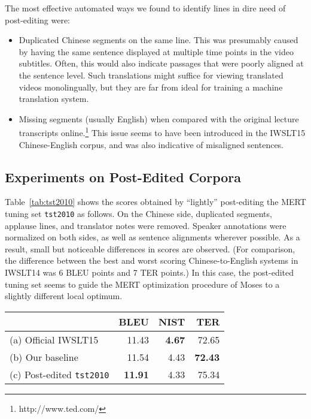 {The most effective automated ways we found to identify lines in dire need of post-editing were:
\begin{itemize}
\item 
Duplicated Chinese segments on the same line. 
This was presumably caused by having the same sentence displayed at multiple time points in the video subtitles. 
Often, this would also indicate passages that were poorly aligned at the sentence level.
Such translations might suffice for viewing translated videos monolingually, but they are far from ideal for training a machine translation system.

\item 
Missing segments (usually English) when compared with the original lecture transcripts online.\footnote{http://www.ted.com/} 
This issue seems to have been introduced in the IWSLT15 Chinese-English corpus, and was also indicative of misaligned sentences.
\end{itemize}



\subsection{Experiments on Post-Edited Corpora}
\label{subsec:post_edited}

Table~\ref{tab:tst2010} shows the scores obtained by ``lightly'' post-editing the MERT tuning set {\small \tt tst2010} as follows. 
On the Chinese side, duplicated segments, applause lines, and translator notes were removed. 
Speaker annotations were normalized on both sides, as well as sentence alignments wherever possible.
As a result, small but noticeable differences in scores are observed. 
(For comparison, the difference between the best and worst scoring Chinese-to-English systems in IWSLT14  was 6 BLEU points and 7 TER points.)
In this case, the post-edited tuning set seems to guide the MERT optimization procedure of Moses to a slightly different local optimum.

\begin{table}[ht]
\centering
\begin{tabular}{|l|r|r|r|}
\hline
                    & BLEU  & NIST & TER    \\ \hline
(a) Official IWSLT15    & 11.43 & \textbf{4.67} & 72.65  \\ \hline
(b) Our baseline        & 11.54 & 4.43 & \textbf{72.43} \\ \hline
(c) Post-edited {\small \tt tst2010} & \textbf{11.91} & 4.33 & 75.34 \\ \hline
\end{tabular}


\end{table}}
